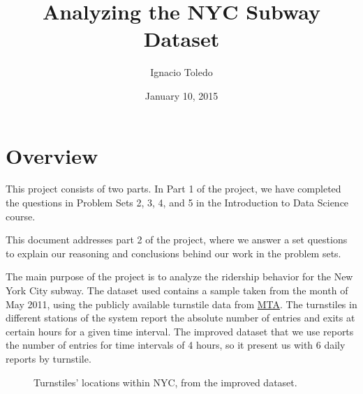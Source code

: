 \documentclass[a4paper,12pt,english]{sphinxmanual}
\title{Analyzing the NYC Subway Dataset}
\date{January 10, 2015}
\author{Ignacio Toledo}
\begin{document}
\maketitle
\tableofcontents
{}\label{index::doc}



\chapter{Overview}
\label{overview:overview}\label{overview::doc}\label{overview:analyzing-the-nyc-subway-dataset}
This project consists of two parts. In Part 1 of the project, we have completed
the questions in Problem Sets 2, 3, 4, and 5 in the Introduction to
Data Science course.

This document addresses part 2 of the project, where we answer a set questions
to explain our reasoning and conclusions behind our work in the problem sets.

The main purpose of the project is to analyze the ridership behavior for the
New York City subway. The dataset used contains a sample taken from the month
of May 2011, using the publicly available turnstile data from
\href{http://web.mta.info/developers/turnstile.html}{MTA}. The turnstiles in
different stations of the system report the absolute number of entries and exits
at certain hours for a given time interval. The improved dataset that we use
reports the number of entries for time intervals of 4 hours, so it present us
with 6 daily reports by turnstile.
\begin{figure}[htbp]
\centering
\capstart

\caption{Turnstiles' locations within NYC, from the improved dataset.}\end{figure}
\end{document}
